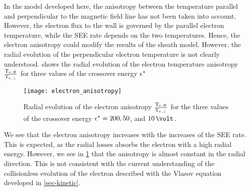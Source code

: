 \space{1ex}
In the model developed here, the anisotropy between the temperature parallel and perpendicular to the magnetic field line has not been taken into account.
However, the electron flux to the wall is governed by the parallel electron temperature, while the \ac{SEE} rate depends on the two temperatures.
Hence, the electron anisotropy could modify the results of the sheath model.
However, the radial evolution of the perpendicular electron temperature is not clearly understood.
 shows the radial evolution of the electron temperature anisotropy  $\frac{\mathrm{T_e}{}_{, R}}{\mathrm{T_e}{}_{, \perp}}$ for three values of the crossover energy $\epsilon^{*}$

\begin{figure}[!ht]
  \centering
  \texttt{[image: electron\_anisotropy]}
  \caption{Radial evolution of the electron anisotropy $\frac{\mathrm{T_e}{}_{, R}}{\mathrm{T_e}{}_{, \perp}}$ for the three values of the crossover energy $\epsilon^{*}=200, 50$, and $10\,\volt$.}
  \label{fig-anisotropy}
\end{figure}

We see that the electron anisotropy increases with the increases of the \ac{SEE} rate.
This is expected, as the radial losses absorbs the electron with a high radial energy.
However, we see in \cref{fig-anisotropy} that the anisotropy is almost constant in the radial direction.
This is not consistent with the current understanding of the collisionless evolution of the electron described with the Vlasov equation developed in \cref{sec-kinetic}.




